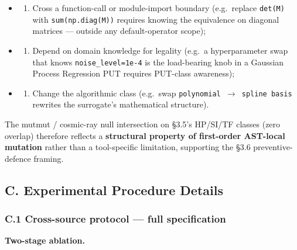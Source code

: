 \documentclass[review,12pt,authoryear]{elsarticle}
\providecommand{\tightlist}{\setlength{\itemsep}{0pt}\setlength{\parskip}{0pt}}
\begin{document}
\begin{itemize}
\tightlist
\item
  \begin{enumerate}
  \def\labelenumi{(\alph{enumi})}
  \tightlist
  \item
    Cross a function-call or module-import boundary (e.g.~replace
    \texttt{det(M)} with \texttt{sum(np.diag(M))} requires knowing the
    equivalence on diagonal matrices --- outside any default-operator
    scope);
  \end{enumerate}
\item
  \begin{enumerate}
  \def\labelenumi{(\alph{enumi})}
  \setcounter{enumi}{1}
  \tightlist
  \item
    Depend on domain knowledge for legality (e.g.~a hyperparameter swap
    that knows \texttt{noise\_level=1e-4} is the load-bearing knob in a
    Gaussian Process Regression PUT requires PUT-class awareness);
  \end{enumerate}
\item
  \begin{enumerate}
  \def\labelenumi{(\alph{enumi})}
  \setcounter{enumi}{2}
  \tightlist
  \item
    Change the algorithmic class (e.g.~swap
    \texttt{polynomial\ $\to$\ spline\ basis} rewrites the surrogate's
    mathematical structure).
  \end{enumerate}
\end{itemize}

The mutmut / cosmic-ray null intersection on §3.5's HP/SI/TF classes
(zero overlap) therefore reflects a \textbf{structural property of
first-order AST-local mutation} rather than a tool-specific limitation,
supporting the §3.6 preventive-defence framing.


\subsection{C. Experimental Procedure Details}\label{c.-experimental-procedure-details}

\subsubsection{C.1 Cross-source protocol --- full specification}\label{c.1-cross-source-v4-protocol-full-specification}

\textbf{Two-stage ablation.}
\end{document}

